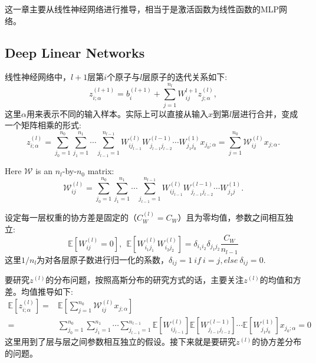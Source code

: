 这一章主要从线性神经网络进行推导，相当于是激活函数为线性函数的MLP网络。

\subsection{Deep Linear Networks}

线性神经网络中，$l+1$层第$i$个原子与$l$层原子的迭代关系如下:
\begin{equation}
    z_{i;\alpha}^{(l+1)} = b_i^{(l+1)} + \sum_{j=1}^{n_l} W_{ij}^{l+1}z_{j;\alpha}^{(l)},
\end{equation}
这里$\alpha$用来表示不同的输入样本。实际上可以直接从输入$x$到第$l$层进行合并，变成一个矩阵相乘的形式:
\begin{equation}
    z_{i;\alpha}^{(l)} = \sum_{j_0=1}^{n_0}\sum_{j_1=1}^{n_1} \cdots \sum_{j_{l-1}=1}^{n_{l-1}}
                W_{ij_{l-1}}^{(l)} W_{j_{l-1}j_{l-2}}^{(l-1)} \cdots W_{j_1j_0}^{(1)} x_{j_0;\alpha}
              = \sum_{j=1}^{n_0} \mathcal{W}_{ij}^{(l)} x_{j;\alpha}.
\end{equation}

Here $\mathcal{W}$ is an $n_l$-by-$n_0$ matrix:
\begin{equation}
    \mathcal{W}_{ij}^{(l)} = \sum_{j_0=1}^{n_0}\sum_{j_1=1}^{n_1} \cdots \sum_{j_{l-1}=1}^{n_{l-1}}
                W_{ij_{l-1}}^{(l)} W_{j_{l-1}j_{l-2}}^{(l-1)} \cdots W_{j_1j}^{(1)}.
\end{equation}

设定每一层权重的协方差是固定的（$C_W^{(l)} = C_W$）且为零均值，参数之间相互独立:
\begin{equation}
    \mathbb{E}[W_{ij}^{(l)} = 0], ~~ \mathbb{E}[W_{i_1j_1}^{(l)}W_{i_2j_2}^{(l)}] 
                                    = \delta_{i_1i_2}\delta_{j_1j_2}\frac{C_W}{n_{l-1}}
    \label{eq:expectation}
\end{equation}
这里$1/n_l$为对各层原子数进行归一化的系数，$\delta_{ij} = 1 ~ if ~ i=j, else ~ \delta_{ij} = 0$.

要研究$z^{(l)}$的分布问题，按照高斯分布的研究方式的话，主要关注$z^{(l)}$的均值和方差。均值推导如下:
\begin{equation}
    \begin{aligned}
    \mathbb{E}[z_{i;\alpha}^{(l)}] =& \mathbb{E}[\sum_{j=1}^{n_0} \mathcal{W}_{ij}^{(l)} x_{j;\alpha}] \\
     =& \sum_{j_0=1}^{n_0}\sum_{j_1=1}^{n_1} \cdots \sum_{j_{l-1}=1}^{n_{l-1}}
       \mathbb{E}[W_{ij_{l-1}}^{(l)}] \mathbb{E}[W_{j_{l-1}j_{l-2}}^{(l-1)}]
       \cdots \mathbb{E}[W_{j_1j_0}^{(1)}] x_{j_0;\alpha} = 0
    \end{aligned}
\end{equation}
这里用到了层与层之间参数相互独立的假设。接下来就是要研究$z^{(l)}$的协方差分布的问题。

